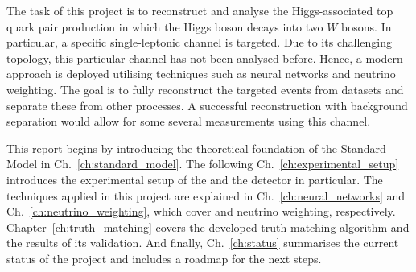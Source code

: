 \documentclass[bachelor,ngerman,english]{GAUBM}
\begin{document}
The task of this project is to reconstruct and analyse the Higgs-associated top quark pair production in which the Higgs boson decays into two $W$ bosons. In particular, a specific single-leptonic channel is targeted. Due to its challenging topology, this particular channel has not been analysed before. Hence, a modern approach is deployed utilising techniques such as neural networks and neutrino weighting. The goal is to fully reconstruct the targeted events from \atlas datasets and separate these from other processes. A successful reconstruction with background separation would allow for some several measurements using this channel.

This report begins by introducing the theoretical foundation of the Standard Model in Ch.~\ref{ch:standard_model}. The following Ch.~\ref{ch:experimental_setup} introduces the experimental setup of the \lhc and the \atlas detector in particular. The techniques applied in this project are explained in Ch.~\ref{ch:neural_networks} and Ch.~\ref{ch:neutrino_weighting}, which cover \spanet and neutrino weighting, respectively. Chapter~\ref{ch:truth_matching} covers the developed truth matching algorithm and the results of its validation. And finally, Ch.~\ref{ch:status} summarises the current status of the project and includes a roadmap for the next steps. 




\end{document}
